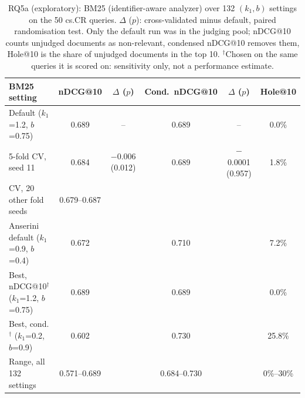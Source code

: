 \begin{table}[htb]
\centering
\small
\caption{RQ5a (exploratory): BM25 (identifier-aware analyzer) over 132 $(k_1, b)$ settings on the 50 cs.CR queries. $\Delta$ ($p$): cross-validated minus default, paired randomisation test. Only the default run was in the judging pool; nDCG@10 counts unjudged documents as non-relevant, condensed nDCG@10 removes them, Hole@10 is the share of unjudged documents in the top 10. $^\dagger$Chosen on the same queries it is scored on: sensitivity only, not a performance estimate.}
\label{tab:rq5sweep}
\begin{tabular}{lccccc}
\toprule
BM25 setting & nDCG@10 & $\Delta$ ($p$) & Cond.\ nDCG@10 & $\Delta$ ($p$) & Hole@10 \\
\midrule
Default ($k_1$=1.2, $b$=0.75) & 0.689 & -- & 0.689 & -- & 0.0\% \\
5-fold CV, seed 11 & 0.684 & $-$0.006 (0.012) & 0.689 & $-$0.0001 (0.957) & 1.8\% \\
CV, 20 other fold seeds & 0.679--0.687 &  &  &  &  \\
Anserini default ($k_1$=0.9, $b$=0.4) & 0.672 &  & 0.710 &  & 7.2\% \\
Best, nDCG@10$^\dagger$ ($k_1$=1.2, $b$=0.75) & 0.689 &  & 0.689 &  & 0.0\% \\
Best, cond.$^\dagger$ ($k_1$=0.2, $b$=0.9) & 0.602 &  & 0.730 &  & 25.8\% \\
Range, all 132 settings & 0.571--0.689 &  & 0.684--0.730 &  & 0\%--30\% \\
\bottomrule
\end{tabular}
\end{table}
